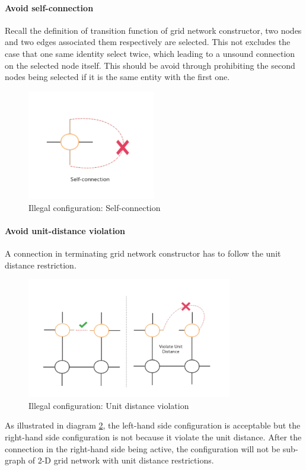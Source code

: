 \paragraph{Avoid self-connection}\noindent
Recall the definition of transition function of grid network constructor, two nodes and two edges associated them respectively are selected.
This not excludes the case that one same identity select twice, which leading to a
unsound connection on the selected node itself. This should be avoid through prohibiting the second nodes being selected if it is the
same entity with the first one.
\begin{figure}[H]
\begin{center}
\includegraphics[width = 0.5\textwidth]{context/diagram/self-connection.pdf}
\caption{Illegal configuration: Self-connection}
\label{selfcon}
\end{center}
\end{figure}

\par\noindent
\paragraph{Avoid unit-distance violation}\noindent
A connection in terminating grid network constructor has to follow the unit distance restriction.
\begin{figure}[H]
\begin{center}
\includegraphics[width = 0.8\textwidth]{context/diagram/unitDistanceViolation.pdf}
\caption{Illegal configuration: Unit distance violation}
\label{unitvio}
\end{center}
\end{figure}
\par\noindent
As illustrated in diagram \ref{unitvio}, the left-hand side configuration is acceptable but the right-hand side configuration is not because
it violate the unit distance. After the connection in the right-hand side being active, the configuration will not be sub-graph of 2-D grid network
with unit distance restrictions.

